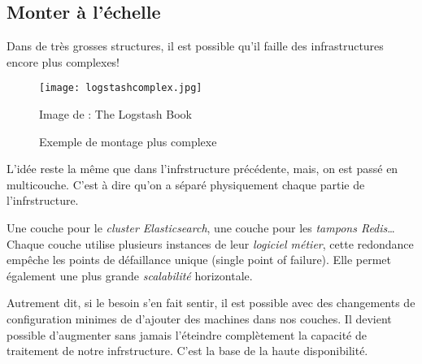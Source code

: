 \subsection{Monter à l'échelle}
Dans de très grosses structures, il est possible qu'il faille des infrastructures
encore plus complexes!

\begin{figure}[H]
\center
\texttt{[image: logstashcomplex.jpg]}
\label{fig:logstashcomplex}
\caption{Exemple de montage plus complexe}
{\footnotesize Image de : The Logstash Book}
\end{figure}

L'idée reste la même que dans l'infrstructure précédente, mais, on est passé en multicouche.
C'est à dire qu'on a séparé physiquement chaque partie de l'infrstructure. 

Une couche pour le \textit{cluster Elasticsearch}, une couche pour les \textit{tampons Redis}\ldots
Chaque couche utilise plusieurs instances de leur \textit{logiciel métier}, cette redondance empêche les
points de défaillance unique (single point of failure). Elle permet également une
plus grande \textit{scalabilité} horizontale. 

Autrement dit, si le besoin s'en fait
sentir, il est possible avec des changements de configuration minimes de d'ajouter
des machines dans nos couches. Il devient possible d'augmenter sans jamais l'éteindre 
complètement la capacité de traitement de notre infrstructure. C'est la base de la
haute disponibilité.

